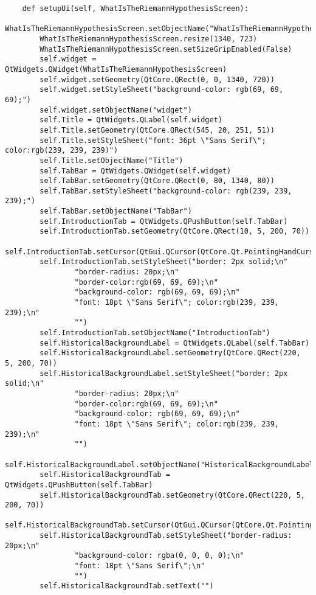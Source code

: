 \documentclass{article}
\begin{document}
\begin{lstlisting}
    def setupUi(self, WhatIsTheRiemannHypothesisScreen):
        WhatIsTheRiemannHypothesisScreen.setObjectName("WhatIsTheRiemannHypothesisScreen")
        WhatIsTheRiemannHypothesisScreen.resize(1340, 723)
        WhatIsTheRiemannHypothesisScreen.setSizeGripEnabled(False)
        self.widget = QtWidgets.QWidget(WhatIsTheRiemannHypothesisScreen)
        self.widget.setGeometry(QtCore.QRect(0, 0, 1340, 720))
        self.widget.setStyleSheet("background-color: rgb(69, 69, 69);")
        self.widget.setObjectName("widget")
        self.Title = QtWidgets.QLabel(self.widget)
        self.Title.setGeometry(QtCore.QRect(545, 20, 251, 51))
        self.Title.setStyleSheet("font: 36pt \"Sans Serif\"; color:rgb(239, 239, 239)")
        self.Title.setObjectName("Title")
        self.TabBar = QtWidgets.QWidget(self.widget)
        self.TabBar.setGeometry(QtCore.QRect(0, 80, 1340, 80))
        self.TabBar.setStyleSheet("background-color: rgb(239, 239, 239);")
        self.TabBar.setObjectName("TabBar")
        self.IntroductionTab = QtWidgets.QPushButton(self.TabBar)
        self.IntroductionTab.setGeometry(QtCore.QRect(10, 5, 200, 70))
        self.IntroductionTab.setCursor(QtGui.QCursor(QtCore.Qt.PointingHandCursor))
        self.IntroductionTab.setStyleSheet("border: 2px solid;\n"
                "border-radius: 20px;\n"
                "border-color:rgb(69, 69, 69);\n"
                "background-color: rgb(69, 69, 69);\n"
                "font: 18pt \"Sans Serif\"; color:rgb(239, 239, 239);\n"
                "")
        self.IntroductionTab.setObjectName("IntroductionTab")
        self.HistoricalBackgroundLabel = QtWidgets.QLabel(self.TabBar)
        self.HistoricalBackgroundLabel.setGeometry(QtCore.QRect(220, 5, 200, 70))
        self.HistoricalBackgroundLabel.setStyleSheet("border: 2px solid;\n"
                "border-radius: 20px;\n"
                "border-color:rgb(69, 69, 69);\n"
                "background-color: rgb(69, 69, 69);\n"
                "font: 18pt \"Sans Serif\"; color:rgb(239, 239, 239);\n"
                "")
        self.HistoricalBackgroundLabel.setObjectName("HistoricalBackgroundLabel")
        self.HistoricalBackgroundTab = QtWidgets.QPushButton(self.TabBar)
        self.HistoricalBackgroundTab.setGeometry(QtCore.QRect(220, 5, 200, 70))
        self.HistoricalBackgroundTab.setCursor(QtGui.QCursor(QtCore.Qt.PointingHandCursor))
        self.HistoricalBackgroundTab.setStyleSheet("border-radius: 20px;\n"
                "background-color: rgba(0, 0, 0, 0);\n"
                "font: 18pt \"Sans Serif\";\n"
                "")
        self.HistoricalBackgroundTab.setText("")

\end{lstlisting}
\end{document}

